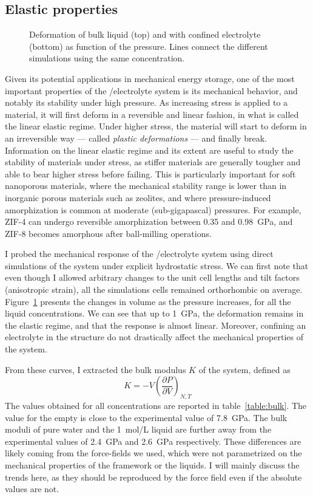 \documentclass[thesis]{subfiles}
\begin{document}
\subsection{Elastic properties}

\begin{figure}[ht]
    \centering
    
    \caption{Deformation of bulk liquid (top) and  with confined electrolyte
    (bottom) as function of the pressure. Lines connect the different simulations
    using the same concentration.}
    \label{fig:licl-zif:pv}
\end{figure}

Given its potential applications in mechanical energy storage, one of the most
important properties of the /electrolyte system is its mechanical behavior,
and notably its stability under high pressure. As increasing stress is applied
to a material, it will first deform in a reversible and linear fashion, in what
is called the linear elastic regime. Under higher stress, the material will
start to deform in an irreversible way --- called \emph{plastic deformations}
--- and finally break. Information on the linear elastic regime and its extent
are useful to study the stability of materials under stress, as stiffer
materials are generally tougher and able to bear higher stress before failing.
This is particularly important for soft nanoporous materials, where the
mechanical stability range is lower than in inorganic porous materials such as
zeolites, and where pressure-induced amorphization is common at moderate
(sub-gigapascal) pressures. For example, ZIF-4 can undergo reversible
amorphization between 0.35 and \SI{0.98}{GPa}\cite{Bennett2011}, and ZIF-8
becomes amorphous after ball-milling operations\cite{Cao2012, AOrtiz2013}.

I probed the mechanical response of the /electrolyte system using direct
simulations of the system under explicit hydrostatic stress. We can first note
that even though I allowed arbitrary changes to the unit cell lengths and tilt
factors (anisotropic strain), all the simulations cells remained orthorhombic on
average. Figure~\ref{fig:licl-zif:pv} presents the changes in volume as the
pressure increases, for all the liquid concentrations. We can see that up to
\SI{1}{GPa}, the deformation remains in the elastic regime, and that the
response is almost linear. Moreover, confining an electrolyte in the 
structure do not drastically affect the mechanical properties of the system.

From these curves, I extracted the bulk modulus $K$ of the system, defined as
\[K = -V\left(\frac{\partial P}{\partial V}\right)_{N,T}\]
The values obtained for all concentrations are reported in
table~\ref{table:bulk}. The value for the empty  is close to the
experimental\cite{Tan2012} value of \SI{7.8}{GPa}. The bulk moduli of pure water
and the \SI{1}{mol/L} liquid are further away from the experimental
values\cite{Lanman1934} of \SI{2.4}{GPa} and \SI{2.6}{GPa} respectively. These
differences are likely coming from the force-fields we used, which were not
parametrized on the mechanical properties of the framework or the liquids. I
will mainly discuss the trends here, as they should be reproduced by the force
field even if the absolute values are not.
\end{document}
